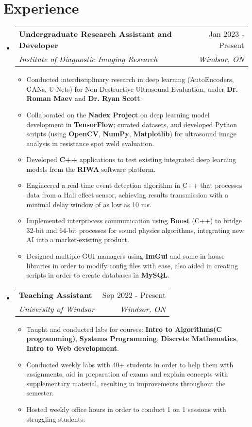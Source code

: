 \documentclass[letterpaper,11pt]{article}
\makeatletter
\newcommand{\resumeItem}[1]{
  \item\small{
    {#1 \vspace{-2pt}}
  }
}
\newcommand{\resumeSubheading}[4]{
  \vspace{-2pt}\item
    \begin{tabular*}{0.97\textwidth}[t]{l@{\extracolsep{\fill}}r}
      \textbf{#1} & #2 \\
      \textit{\small#3} & \textit{\small #4} \\
    \end{tabular*}\vspace{-7pt}
}
\newcommand{\resumeSubHeadingListStart}{\begin{itemize}[leftmargin=0.15in, label={}]}
\newcommand{\resumeSubHeadingListEnd}{\end{itemize}}
\newcommand{\resumeItemListStart}{\begin{itemize}}
\newcommand{\resumeItemListEnd}{\end{itemize}\vspace{-5pt}}
\makeatother
\begin{document}
\section{Experience}
  \resumeSubHeadingListStart

    \resumeSubheading
      {Undergraduate Research Assistant and Developer}{Jan 2023 - Present}
      {Institute of Diagnostic Imaging Research}{Windsor, ON}
      \resumeItemListStart
        \resumeItem{Conducted interdisciplinary research in deep learning (AutoEncoders, GANs, U-Nets) for Non-Destructive Ultrasound Evaluation, under \textbf{Dr. Roman Maev} and \textbf{Dr. Ryan Scott}.}
        \resumeItem{Collaborated on the \textbf{Nadex Project} on deep learning model development in \textbf{TensorFlow}; curated datasets, and developed Python scripts (using \textbf{OpenCV}, \textbf{NumPy}, \textbf{Matplotlib}) for ultrasound image analysis in resistance spot weld evaluation.}
        \resumeItem{Developed \textbf{C++} applications to test existing integrated deep learning models from the \textbf{RIWA} software platform.}
        \resumeItem{Engineered a real-time event detection algorithm in C++ that processes data from a Hall effect sensor, achieving results transmission with a minimal delay window of as low as 10 ms.}
        \resumeItem{Implemented interprocess communication using \textbf{Boost} (C++) to bridge 32-bit and 64-bit processes for sound physics algorithms, integrating new AI into a market-existing product. }
        \resumeItem{Designed multiple GUI managers using \textbf{ImGui} and some in-house libraries in order to modify config files with ease, also aided in creating scripts in order to create databases in \textbf{MySQL}. }
      \resumeItemListEnd
      

    \resumeSubheading
      {Teaching Assistant}{Sep 2022 - Present}
      {University of Windsor}{Windsor, ON}
      \resumeItemListStart
        \resumeItem{Taught and conducted labs for courses: \textbf{Intro to Algorithms(C programming)}, \textbf{Systems Programming}, \textbf{Discrete Mathematics}, \textbf{Intro to Web development}.}
        \resumeItem{Conducted weekly labs with 40+ students in order to help them with assignments, aid in preparation of exams and explain concepts with supplementary material, resulting in improvements throughout the semester. }
        \resumeItem{Hosted weekly office hours in order to conduct 1 on 1 sessions with struggling students. }
    \resumeItemListEnd

  \resumeSubHeadingListEnd
\end{document}
